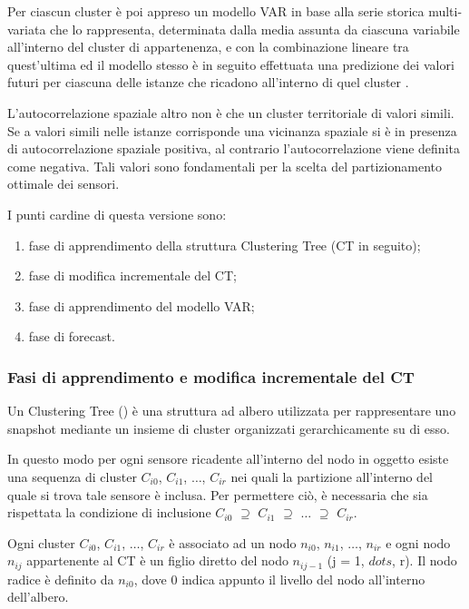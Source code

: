 \documentclass[12pt,a4paper,twoside,openright]{book}
\begin{document}
Per ciascun cluster è poi appreso un modello VAR in base alla serie storica multi-variata che lo rappresenta, determinata dalla media assunta da ciascuna variabile all'interno del cluster di appartenenza, e con la combinazione lineare tra quest'ultima ed il modello stesso è in seguito effettuata una predizione dei valori futuri per ciascuna delle istanze che ricadono all'interno di quel cluster \cite{donato}.

L'autocorrelazione spaziale altro non è che un cluster territoriale di valori simili. Se a valori simili nelle istanze corrisponde una vicinanza spaziale si è in presenza di autocorrelazione spaziale positiva, al contrario l'autocorrelazione viene definita come negativa. Tali valori sono fondamentali per la scelta del partizionamento ottimale dei sensori.

I punti cardine di questa versione sono:
\begin{enumerate}
\item fase di apprendimento della struttura Clustering Tree (CT in seguito);
\item fase di modifica incrementale del CT;
\item fase di apprendimento del modello VAR;
\item fase di forecast.
\end{enumerate}

\subsubsection{Fasi di apprendimento e modifica incrementale del CT}
Un Clustering Tree (\cite{donato}) è una struttura ad albero utilizzata per rappresentare uno snapshot  mediante un insieme di cluster organizzati gerarchicamente su di esso.

In questo modo per ogni sensore ricadente all'interno del nodo in oggetto esiste una sequenza di cluster $C_{i0}$, $C_{i1}$, $\dots$, $C_{ir}$ nei quali la partizione all'interno del quale si trova tale sensore è inclusa. Per permettere ciò, è necessaria che sia rispettata la condizione di inclusione $C_{i0}$ $\supseteq$ $C_{i1}$ $\supseteq$ $\dots$ $\supseteq$ $C_{ir}$. 
\

Ogni cluster $C_{i0}$, $C_{i1}$, $\dots$, $C_{ir}$ è associato ad un nodo $n_{i0}$, $n_{i1}$, $\dots$, $n_{ir}$ e ogni nodo $n_{ij}$ appartenente al CT è un figlio diretto del nodo $n_{ij-1}$ (j = 1, $dots$, r). Il nodo radice è definito da $n_{i0}$, dove 0 indica appunto il livello del nodo all'interno dell'albero.
\end{document}
